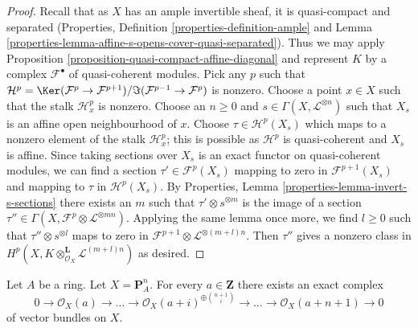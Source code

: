 \begin{proof}
Recall that as $X$ has an ample invertible sheaf, it is quasi-compact
and separated (Properties, Definition \ref{properties-definition-ample} and
Lemma \ref{properties-lemma-affine-s-opens-cover-quasi-separated}).
Thus we may apply
Proposition \ref{proposition-quasi-compact-affine-diagonal}
and represent $K$ by a complex $\mathcal{F}^\bullet$ of
quasi-coherent modules. Pick any $p$ such that
$\mathcal{H}^p = \Ker(\mathcal{F}^p \to \mathcal{F}^{p + 1})/
\Im(\mathcal{F}^{p - 1} \to \mathcal{F}^p)$ is nonzero.
Choose a point $x \in X$ such that the stalk $\mathcal{H}^p_x$ is
nonzero. Choose an $n \geq 0$ and $s \in \Gamma(X, \mathcal{L}^{\otimes n})$
such that $X_s$ is an affine open neighbourhood of $x$.
Choose $\tau \in \mathcal{H}^p(X_s)$ which maps to a nonzero
element of the stalk $\mathcal{H}^p_x$; this is possible
as $\mathcal{H}^p$ is quasi-coherent and $X_s$ is affine.
Since taking sections over $X_s$ is an exact functor on
quasi-coherent modules, we can find a section $\tau' \in \mathcal{F}^p(X_s)$
mapping to zero in $\mathcal{F}^{p + 1}(X_s)$ and mapping to
$\tau$ in $\mathcal{H}^p(X_s)$. By
Properties, Lemma \ref{properties-lemma-invert-s-sections}
there exists an $m$ such that $\tau' \otimes s^{\otimes m}$
is the image of a section
$\tau'' \in \Gamma(X, \mathcal{F}^p \otimes \mathcal{L}^{\otimes mn})$.
Applying the same lemma once more, we find $l \geq 0$ such that
$\tau'' \otimes s^{\otimes l}$ maps to zero in
$\mathcal{F}^{p + 1} \otimes \mathcal{L}^{\otimes (m + l)n}$.
Then $\tau''$ gives a nonzero class in
$H^p(X, K \otimes^\mathbf{L}_{\mathcal{O}_X} \mathcal{L}^{(m + l)n})$
as desired.
\end{proof}

\begin{lemma}
\label{lemma-construct-the-next-one}
Let $A$ be a ring. Let $X = \mathbf{P}^n_A$. For every $a \in \mathbf{Z}$
there exists an exact complex
$$
0 \to \mathcal{O}_X(a) \to \ldots
\to \mathcal{O}_X(a + i)^{\oplus {n + 1 \choose i}} \to
\ldots \to \mathcal{O}_X(a + n + 1) \to 0
$$
of vector bundles on $X$.
\end{lemma}

